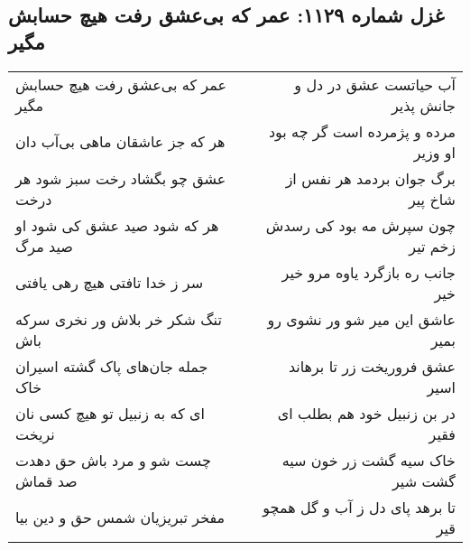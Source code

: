 \begin{center}
\section*{غزل شماره ۱۱۲۹: عمر که بی‌عشق رفت هیچ حسابش مگیر}
\label{sec:1129}
\begin{longtable}{l p{0.5cm} r}
عمر که بی‌عشق رفت هیچ حسابش مگیر
&&
آب حیاتست عشق در دل و جانش پذیر
\\
هر که جز عاشقان ماهی بی‌آب دان
&&
مرده و پژمرده است گر چه بود او وزیر
\\
عشق چو بگشاد رخت سبز شود هر درخت
&&
برگ جوان بردمد هر نفس از شاخ پیر
\\
هر که شود صید عشق کی شود او صید مرگ
&&
چون سپرش مه بود کی رسدش زخم تیر
\\
سر ز خدا تافتی هیچ رهی یافتی
&&
جانب ره بازگرد یاوه مرو خیر خیر
\\
تنگ شکر خر بلاش ور نخری سرکه باش
&&
عاشق این میر شو ور نشوی رو بمیر
\\
جمله جان‌های پاک گشته اسیران خاک
&&
عشق فروریخت زر تا برهاند اسیر
\\
ای که به زنبیل تو هیچ کسی نان نریخت
&&
در بن زنبیل خود هم بطلب ای فقیر
\\
چست شو و مرد باش حق دهدت صد قماش
&&
خاک سیه گشت زر خون سیه گشت شیر
\\
مفخر تبریزیان شمس حق و دین بیا
&&
تا برهد پای دل ز آب و گل همچو قیر
\\
\end{longtable}
\end{center}

